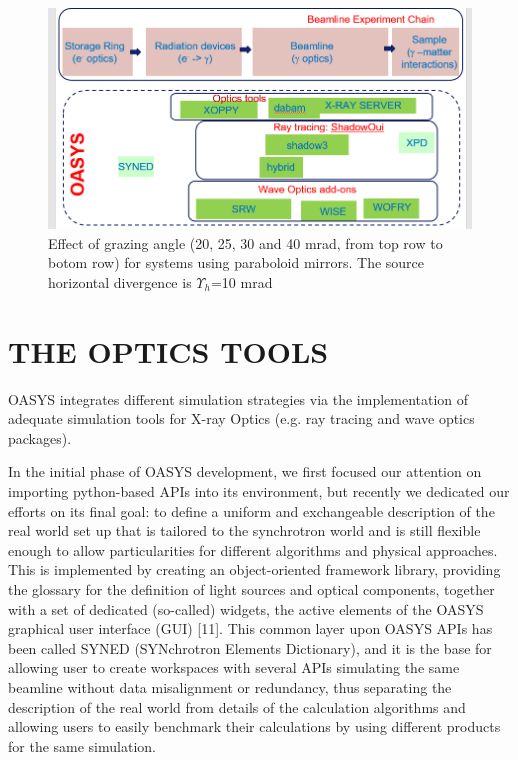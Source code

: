 \documentclass{aip-cp}
\begin{document}
\begin{figure}[h]
\includegraphics[width=14cm]{FIGURES/chain.png}
\caption{Effect of grazing angle (20, 25, 30 and 40 mrad, from top row to botom row) for systems using paraboloid mirrors. The source horizontal divergence is $\Upsilon_h$=10 mrad}
\label{figGrazing}
\end{figure}


\section{THE OPTICS TOOLS}

% 
% 
% 
% 

OASYS integrates different simulation strategies via the implementation of adequate simulation tools for X-ray Optics (e.g. ray tracing and wave optics packages). 




In the initial phase of OASYS development, we first focused our attention on importing python-based APIs into its environment, but recently we dedicated our efforts on its final goal: to define a uniform and exchangeable description of the real world set up that is tailored to the synchrotron world and is still flexible enough to allow particularities for different algorithms and physical approaches. This is implemented by creating an object-oriented framework library, providing the glossary for the definition of light sources and optical components, together with a set of dedicated (so-called) widgets, the active elements of the OASYS graphical user interface (GUI) [11]. This common layer upon OASYS APIs has been called SYNED (SYNchrotron Elements Dictionary), and it is the base for allowing user to create workspaces with several APIs simulating the same beamline without data misalignment or redundancy, thus separating the description of the real world from details of the calculation algorithms and allowing users to easily benchmark their calculations by using different products for the same simulation.
\end{document}
